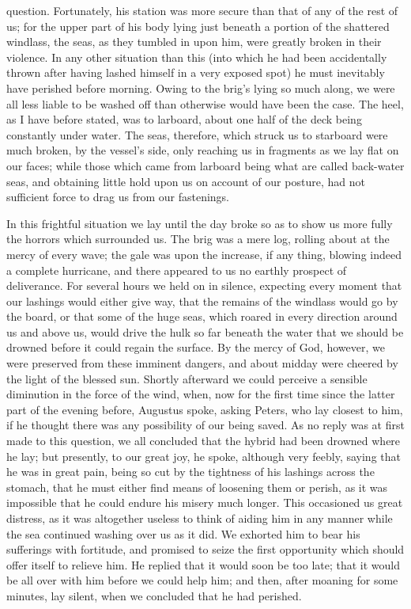 question. Fortunately, his station was more secure than that of any of the rest
of us; for the upper part of his body lying just beneath a portion of the
shattered windlass, the seas, as they tumbled in upon him, were greatly broken
in their violence. In any other situation than this (into which he had been
accidentally thrown after having lashed himself in a very exposed spot) he must
inevitably have perished before morning. Owing to the brig's lying so much
along, we were all less liable to be washed off than otherwise would have been
the case. The heel, as I have before stated, was to larboard, about one half of
the deck being constantly under water. The seas, therefore, which struck us to
starboard were much broken, by the vessel's side, only reaching us in fragments
as we lay flat on our faces; while those which came from larboard being what are
called back-water seas, and obtaining little hold upon us on account of our
posture, had not sufficient force to drag us from our fastenings. 

In this frightful situation we lay until the day broke so as to show us more
fully the horrors which surrounded us. The brig was a mere log, rolling about at
the mercy of every wave; the gale was upon the increase, if any thing, blowing
indeed a complete hurricane, and there appeared to us no earthly prospect of
deliverance. For several hours we held on in silence, expecting every moment
that our lashings would either give way, that the remains of the windlass would
go by the board, or that some of the huge seas, which roared in every direction
around us and above us, would drive the hulk so far beneath the water that we
should be drowned before it could regain the surface. By the mercy of God,
however, we were preserved from these imminent dangers, and about midday were
cheered by the light of the blessed sun. Shortly afterward we could perceive a
sensible diminution in the force of the wind, when, now for the first time since
the latter part of the evening before, Augustus spoke, asking Peters, who lay
closest to him, if he thought there was any possibility of our being saved. As
no reply was at first made to this question, we all concluded that the hybrid
had been drowned where he lay; but presently, to our great joy, he spoke,
although very feebly, saying that he was in great pain, being so cut by the
tightness of his lashings across the stomach, that he must either find means of
loosening them or perish, as it was impossible that he could endure his misery
much longer. This occasioned us great distress, as it was altogether useless to
think of aiding him in any manner while the sea continued washing over us as it
did. We exhorted him to bear his sufferings with fortitude, and promised to
seize the first opportunity which should offer itself to relieve him. He replied
that it would soon be too late; that it would be all over with him before we
could help him; and then, after moaning for some minutes, lay silent, when we
concluded that he had perished. 

